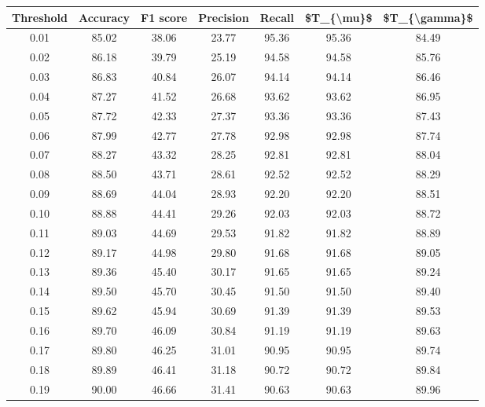 \begin{tabular}{|c|c|c|c|c|c|c|}
\hline
 Threshold &  Accuracy &  F1 score &  Precision &  Recall &  \$T\_\{\textbackslash mu\}\$ &  \$T\_\{\textbackslash gamma\}\$ \\
\hline
      0.01 &     85.02 &     38.06 &      23.77 &   95.36 &      95.36 &         84.49 \\
      0.02 &     86.18 &     39.79 &      25.19 &   94.58 &      94.58 &         85.76 \\
      0.03 &     86.83 &     40.84 &      26.07 &   94.14 &      94.14 &         86.46 \\
      0.04 &     87.27 &     41.52 &      26.68 &   93.62 &      93.62 &         86.95 \\
      0.05 &     87.72 &     42.33 &      27.37 &   93.36 &      93.36 &         87.43 \\
      0.06 &     87.99 &     42.77 &      27.78 &   92.98 &      92.98 &         87.74 \\
      0.07 &     88.27 &     43.32 &      28.25 &   92.81 &      92.81 &         88.04 \\
      0.08 &     88.50 &     43.71 &      28.61 &   92.52 &      92.52 &         88.29 \\
      0.09 &     88.69 &     44.04 &      28.93 &   92.20 &      92.20 &         88.51 \\
      0.10 &     88.88 &     44.41 &      29.26 &   92.03 &      92.03 &         88.72 \\
      0.11 &     89.03 &     44.69 &      29.53 &   91.82 &      91.82 &         88.89 \\
      0.12 &     89.17 &     44.98 &      29.80 &   91.68 &      91.68 &         89.05 \\
      0.13 &     89.36 &     45.40 &      30.17 &   91.65 &      91.65 &         89.24 \\
      0.14 &     89.50 &     45.70 &      30.45 &   91.50 &      91.50 &         89.40 \\
      0.15 &     89.62 &     45.94 &      30.69 &   91.39 &      91.39 &         89.53 \\
      0.16 &     89.70 &     46.09 &      30.84 &   91.19 &      91.19 &         89.63 \\
      0.17 &     89.80 &     46.25 &      31.01 &   90.95 &      90.95 &         89.74 \\
      0.18 &     89.89 &     46.41 &      31.18 &   90.72 &      90.72 &         89.84 \\
      0.19 &     90.00 &     46.66 &      31.41 &   90.63 &      90.63 &         89.96 \\

\end{tabular}
